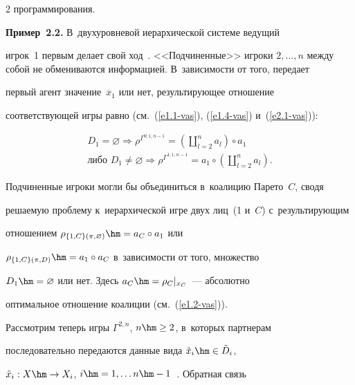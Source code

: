 \begin{multicols}{2}
программирования. 

    

    \textbf{Пример~2.2.} В~двухуровневой иерархической сис\-те\-ме ведущий 

игрок~1 пер\-вым делает свой ход~\cite{2-vas}. <<Подчиненные>> игроки $2, \ldots , 

n$ между собой не обмениваются информацией. В~за\-ви\-си\-мости от того, передает 

пер\-вый агент значение~$\overline{x}_1$ или нет, ре\-зуль\-ти\-ру\-ющее отношение 

со\-от\-вет\-ст\-ву\-ющей игры рав\-но (см.~(\ref{e1.1-vas}), (\ref{e1.4-vas}) и~(\ref{e2.1-vas})):

    \begin{multline}

    D_1=\varnothing\Rightarrow \rho^{\Gamma^{0;1,n-1}} =  \left( 

\coprod\limits_{l=2}^n a_l\right) \circ a_1 \\

  \mbox{либо\ }  D_1\not= \varnothing\Rightarrow \rho^{\Gamma^{1;1,n-1}} =a_1\circ \left( 

\coprod\limits^n_{l=2} a_l\right) .

\label{e2.2-vas}

    \end{multline}

    

    Подчиненные игроки могли бы объединиться в~коалицию Парето~$C$, сводя 

ре\-ша\-емую проб\-ле\-му к~иерархической игре двух лиц~(1 и~$C$) с~ре\-зуль\-ти\-ру\-ющим 

отношением $\rho_{\{1,C\} (\pi,\varnothing)} \hm= a_C \circ a_1$ или 

$\rho_{\{1,C\}(\pi,D)} \hm= a_1\circ a_C$ в~за\-ви\-си\-мости от того, множество 

$D_1\hm=\varnothing$ или нет. Здесь $a_C\hm= \rho_C\vert_{x_C}$~--- абсолютно 

оптимальное отношение коалиции (см.~(\ref{e1.2-vas})). 

    

    Рассмотрим теперь игры $\Gamma^{2,n}$, $n\hm\geq 2$, в~которых партнерам 

последовательно передаются данные вида $\tilde{x}_i \hm\in \tilde{D}_i$, 

$\tilde{x}_i: X\hm\to X_i$, $i\hm= 1,\ldots n\hm-1$~\cite{1-vas, 5-vas}. Обрат\-ная связь 


\end{multicols}
